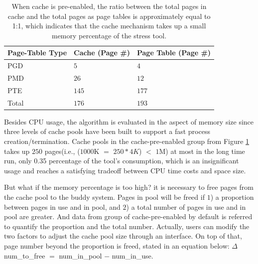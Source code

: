 
\begin{table}[!ht]
\footnotesize
\begin{center}
\begin{tabular}{|l|l|l|}
\hline
{\textbf{Page-Table Type}} & {\textbf{Cache (Page \#)}} & {\textbf{Page Table (Page \#)}} \\ \hline
PGD & $5$  & $4$ \\ \hline
PMD & $26$ & $12$ \\ \hline
PTE & $145$ & $177$ \\ \hline
Total & $176$ & $193$ \\ \hline
\end{tabular}
\end{center}
\caption{When cache is pre-enabled, the ratio between the total pages in cache and the total pages as page tables is approximately equal to 1:1, which indicates that the cache mechanism takes up a small memory percentage of the stress tool.}
\label{tab:prePGpool}
\end{table}

Besides CPU usage, the algorithm is evaluated in the aspect of memory size since three levels of cache pools have been built to support a fast process creation/termination. Cache pools in the cache-pre-enabled group from Figure \ref{tab:prePGpool} takes up $250$ pages(i.e., ($1000$K $=$ $250 * 4K$) $<$ $1$M) at most in the long time run, only 0.35 percentage of the tool's consumption, which is an insignificant usage and reaches a satisfying tradeoff between CPU time costs and space size.

But what if the memory percentage is too high? it is necessary to free pages from the cache pool to the buddy system. Pages in pool will be freed if $1$) a proportion between pages in use and in pool, and $2$) a total number of pages in use and in pool are greater. And data from group of cache-pre-enabled by default is referred to quantify the proportion and the total number. Actually, users can modify the two factors to adjust the cache pool size through an interface. On top of that, page number beyond the proportion is freed, stated in an equation below: $\Delta$num\_to\_free $=$ num\_in\_pool $-$ num\_in\_use.

